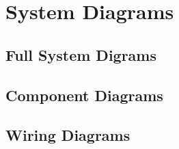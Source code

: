 
\section{System Diagrams}
\label{sec:system_diagrams}


\subsection{Full System Digrams}
\label{sec:full_sys_diagrams}

\subsection{Component Diagrams}
\label{sec:component_diagrams}

\subsection{Wiring Diagrams}
\label{sec:wiring_diagrams}